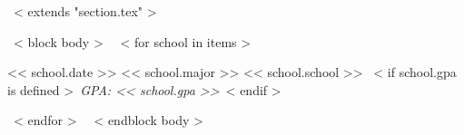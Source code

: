 ~< extends "section.tex" >~

~< block body >~
  ~< for school in items >~
    \begin{samepage}
      \cventry
        {<< school.date >>}
        {<< school.major >>}
        {<< school.school >>}
        {}
        {~< if school.gpa is defined >~\textit{GPA: << school.gpa >>}~< endif >~}
        {}
    \end{samepage}
  ~< endfor >~
~< endblock body >~
